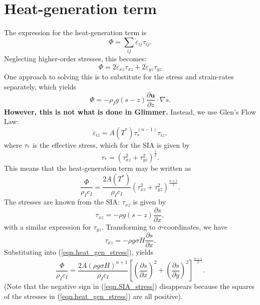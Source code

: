 \documentclass[10pt,english,a4paper]{article}
\newcommand{\diffn}[2]{\ensuremath{\frac{\partial #1}{\partial #2}}}
\begin{document}
\section{Heat-generation term}
%
The expression for the heat-generation term is
%
\begin{equation}
\Phi=\sum_{ij}\dot{\varepsilon}_{ij}\tau_{ij}.
\end{equation}
%
Neglecting higher-order stresses, this becomes:
%
\begin{equation}
\Phi = 2\dot{\varepsilon}_{xz}\tau_{xz}+2\dot{\varepsilon}_{yz}\tau_{yz}
\end{equation}
%
One approach to solving this is to substitute for the stress and strain-rates
separately, which yields
%
\begin{equation}
\Phi = -\rho_I g(s-z)\diffn{\mathbf{u}}{z}\cdot\nabla s.
\end{equation}
%
{\bf However, this is not what is done in Glimmer.} Instead, we use
Glen's Flow Law:
%
\begin{equation}
\dot{\varepsilon}_{iz}=A(T^*)\tau_{*}^{(n-1)}\tau_{iz},
\end{equation}
%
where $\tau_{*}$ is the effective stress, which for the SIA is given
by
%
\begin{equation}
\tau_{*}=\left(\tau_{xz}^2+\tau_{yz}^2\right)^{\frac{1}{2}}.
\end{equation}
%
This means that the heat-generation term may be written as
%
\begin{equation}
\frac{\Phi}{\rho_I c_I}=\frac{2A(T^*)}{\rho_I
  c_I}\left(\tau_{xz}^2+\tau_{yz}^2\right)^{\frac{n+1}{2}}.
\label{eqn.heat_gen_stress}
\end{equation}
%
The stresses are known from the SIA: $\tau_{xz}$ is given by 
%
\begin{equation}
\tau_{xz}=-\rho g(s-z)\diffn{s}{x},
\end{equation}
%
with a similar expression for $\tau_{yz}$. Transforming to
$\sigma$-coordinates, we have
%
\begin{equation}
\tau_{xz}=-\rho g\sigma H\diffn{s}{x}.
\label{eqn.SIA_stress}
\end{equation}
%
Substituting into (\ref{eqn.heat_gen_stress}), yields
%
\begin{equation}
\frac{\Phi}{\rho_I c_I}=\frac{2A(\rho g \sigma H)^{n+1}}{\rho_I
  c_I}\left[\left(\diffn{s}{x}\right)^2+\left(\diffn{s}{y}\right)^2\right]^{\frac{n+1}{2}}.
\end{equation}
%
(Note that the negative sign in (\ref{eqn.SIA_stress}) disappears
because the squares of the stresses in (\ref{eqn.heat_gen_stress}) are
all positive).
\end{document}
